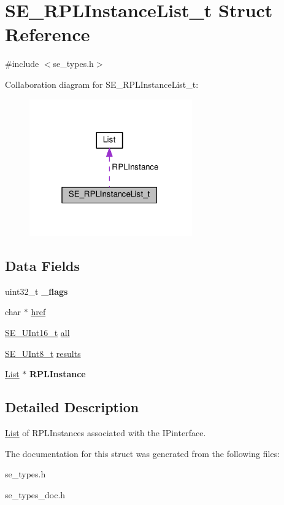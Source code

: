 \hypertarget{structSE__RPLInstanceList__t}{}\section{S\+E\+\_\+\+R\+P\+L\+Instance\+List\+\_\+t Struct Reference}
\label{structSE__RPLInstanceList__t}


{\ttfamily \#include $<$se\+\_\+types.\+h$>$}



Collaboration diagram for S\+E\+\_\+\+R\+P\+L\+Instance\+List\+\_\+t\+:\nopagebreak
\begin{figure}[H]
\begin{center}
\leavevmode
\includegraphics[width=199pt]{structSE__RPLInstanceList__t__coll__graph}
\end{center}
\end{figure}
\subsection*{Data Fields}
\begin{DoxyCompactItemize}
\item 
uint32\+\_\+t {\bfseries \+\_\+flags}
\item 
char $\ast$ \hyperlink{group__RPLInstanceList_ga5fd981ad39b39f7c4b6b6353ea9c322f}{href}
\item 
\hyperlink{group__UInt16_gac68d541f189538bfd30cfaa712d20d29}{S\+E\+\_\+\+U\+Int16\+\_\+t} \hyperlink{group__RPLInstanceList_gaea547d1052c344346088c5fe12121667}{all}
\item 
\hyperlink{group__UInt8_gaf7c365a1acfe204e3a67c16ed44572f5}{S\+E\+\_\+\+U\+Int8\+\_\+t} \hyperlink{group__RPLInstanceList_gab7df2e3cb4ec44c0ffbbb171e81f1c12}{results}
\item 
\hyperlink{structList}{List} $\ast$ {\bfseries R\+P\+L\+Instance}
\end{DoxyCompactItemize}


\subsection{Detailed Description}
\hyperlink{structList}{List} of R\+P\+L\+Instances associated with the I\+Pinterface. 

The documentation for this struct was generated from the following files\+:\begin{DoxyCompactItemize}
\item 
se\+\_\+types.\+h\item 
se\+\_\+types\+\_\+doc.\+h\end{DoxyCompactItemize}
